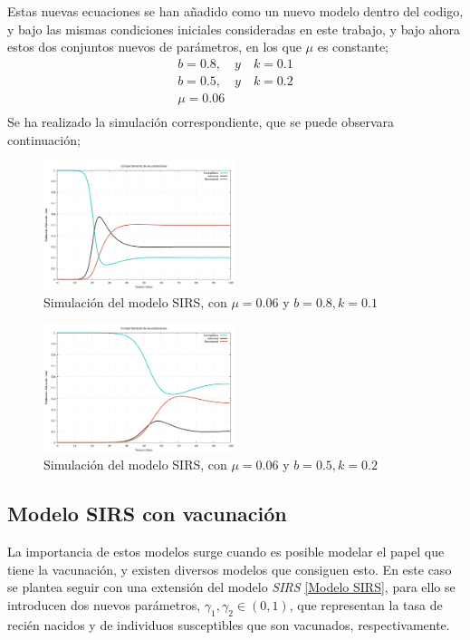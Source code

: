 \documentclass[journal]{IEEEtran}
\begin{document}
Estas nuevas ecuaciones se han añadido como un nuevo modelo dentro del codigo, y bajo las mismas condiciones iniciales
consideradas en este trabajo, y bajo ahora estos dos conjuntos nuevos de parámetros, en los que $\mu$ es constante;
\begin{equation}\label{parametrosSIRS}
	\begin{split}
		b = 0.8, \quad y \quad k = 0.1\\
		b = 0.5, \quad  y \quad k = 0.2\\
		\mu = 0.06\\
	\end{split}
\end{equation}
Se ha realizado la simulación correspondiente, que se puede observara continuación;
\begin{figure}[H]
	\centering
	\includegraphics[width=0.5\textwidth]{SIRS/graph-1-SIRS}
	\caption{Simulación del modelo SIRS, con $\mu = 0.06$ y $b = 0.8, k = 0.1$}
	\label{fig:SIRS}
  \end{figure}
\begin{figure}[H]
  \centering
  \includegraphics[width=0.5\textwidth]{SIRS/graph-2-SIRS}
  \caption{Simulación del modelo SIRS, con $\mu = 0.06$ y $b = 0.5, k = 0.2$}
  \label{fig:SIRS}
\end{figure}


\subsection{Modelo SIRS con vacunación}
La importancia de estos modelos surge cuando es posible modelar el papel que tiene la vacunación, y existen diversos modelos
que consiguen esto. En este caso se plantea seguir con una extensión del modelo \textit{SIRS} \ref{Modelo SIRS},
para ello se introducen dos nuevos parámetros, $\gamma_1, \gamma_2 \in (0,1)$, que representan la tasa de recién nacidos
y de individuos susceptibles que son vacunados, respectivamente.\\ 
\end{document}
